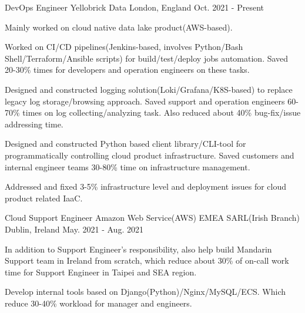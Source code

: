 

\begin{cventries}

    \cventry
        {DevOps Engineer}
        {Yellobrick Data}
        {London, England}
        {Oct. 2021 - Present}
        {
             \begin{cvitems}
                \item
                    {
                        Mainly worked on cloud native data lake product(AWS-based). 
                    }
                \item
                    {
                        Worked on CI/CD pipelines(Jenkins-based, involves Python/Bash Shell/Terraform/Ansible scripts) for build/test/deploy jobs automation. Saved 20-30\% times for developers and operation engineers on these tasks.
                    }
                \item
                    {
                        Designed and constructed logging solution(Loki/Grafana/K8S-based) to replace legacy log storage/browsing approach. Saved support and operation engineers 60-70\% times on log collecting/analyzing task. Also reduced about 40\% bug-fix/issue addressing time. 
                    }
                \item
                    {
                        Designed and constructed Python based client library/CLI-tool for programmatically controlling cloud product infrastructure. Saved customers and internal engineer teams 30-80\% time on infrastructure management. 
                    }
                \item
                    {
                        Addressed and fixed 3-5\% infrastructure level and deployment issues for cloud product related IaaC.
                    }
             \end{cvitems}
        }

    \cventry
        {Cloud Support Engineer}
        {Amazon Web Service(AWS) EMEA SARL(Irish Branch)}
        {Dublin, Ireland}
        {May. 2021 - Aug. 2021}
        {   
            \begin{cvitems}
                \item
                    {
                        In addition to Support Engineer's responsibility, also help build Mandarin Support team in Ireland from scratch, which reduce about 30\% of on-call work time for Support Engineer in Taipei and SEA region.
                    }
                \item
                    {
                        Develop internal tools based on Django(Python)/Nginx/MySQL/ECS. Which reduce 30-40\% workload for manager and engineers.
                    }
            \end{cvitems}
        }


\end{cventries}
